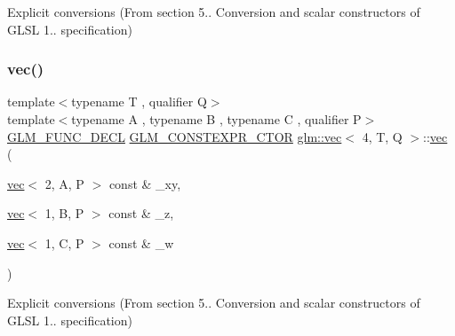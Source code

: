 Explicit conversions (From section 5.. Conversion and scalar constructors of G\+L\+SL 1.. specification) 

\mbox{\label{structglm_1_1vec_3_014_00_01_t_00_01_q_01_4_ae72bf7baa584d35cfadd6d3be750518b}} 
\subsubsection{\texorpdfstring{vec()}{vec()}\hspace{0.1cm}{\footnotesize\ttfamily [9/34]}}
{\footnotesize\ttfamily template$<$typename T , qualifier Q$>$ \\
template$<$typename A , typename B , typename C , qualifier P$>$ \\
\hyperlink{setup_8hpp_ab2d052de21a70539923e9bcbf6e83a51}{G\+L\+M\+\_\+\+F\+U\+N\+C\+\_\+\+D\+E\+CL} \hyperlink{setup_8hpp_ad34178a09666081abdb573c14d1f4a5a}{G\+L\+M\+\_\+\+C\+O\+N\+S\+T\+E\+X\+P\+R\+\_\+\+C\+T\+OR} \hyperlink{structglm_1_1vec}{glm\+::vec}$<$ 4, T, Q $>$\+::\hyperlink{structglm_1_1vec}{vec} (\begin{DoxyParamCaption}\item[{\hyperlink{structglm_1_1vec}{vec}$<$ 2, A, P $>$ const \&}]{\+\_\+xy,  }\item[{\hyperlink{structglm_1_1vec}{vec}$<$ 1, B, P $>$ const \&}]{\+\_\+z,  }\item[{\hyperlink{structglm_1_1vec}{vec}$<$ 1, C, P $>$ const \&}]{\+\_\+w }\end{DoxyParamCaption})}



Explicit conversions (From section 5.. Conversion and scalar constructors of G\+L\+SL 1.. specification) 

\mbox{\label{structglm_1_1vec_3_014_00_01_t_00_01_q_01_4_a888477e1cf2c8bf5418e99450ea850c1}} 
